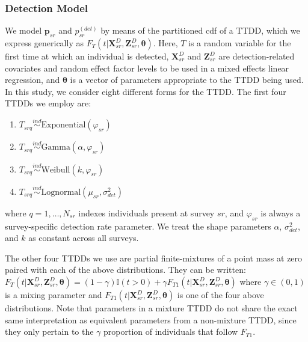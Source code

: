 \documentclass[useAMS,usenatbib,referee,12pt]{article}
\begin{document}
\subsubsection{Detection Model}\label{sec:detectionmodel}
We model $\textbf{p}_{sr}$ and $p_{sr}^{(det)}$ by means of the partitioned cdf of a TTDD, which we express generically as $F_T(t|\textbf{X}_{sr}^D, \textbf{Z}_{sr}^D, \boldsymbol{\theta})$.  Here, $T$ is a random variable for the first time at which an individual is detected, $\textbf{X}_{sr}^D$ and $\textbf{Z}_{sr}^D$ are detection-related covariates and random effect factor levels to be used in a mixed effects linear regression, and $\boldsymbol{\theta}$ is a vector of parameters appropriate to the TTDD being used.  In this study, we consider eight different forms for the TTDD.  The first four TTDDs we employ are:
\begin{enumerate}
\item $T_{srq} \overset{ind}{\sim} \text{Exponential}(\varphi_{sr})$
\item $T_{srq} \overset{ind}{\sim} \text{Gamma}(\alpha, \varphi_{sr})$
\item $T_{srq} \overset{ind}{\sim} \text{Weibull}(k, \varphi_{sr})$
\item $T_{srq} \overset{ind}{\sim} \text{Lognormal}(\mu_{sr}, \sigma_{det}^2)$
\end{enumerate}
where $q = 1,\dotso,N_{sr}$ indexes individuals present at survey $sr$, and $\varphi_{sr}$ is always a survey-specific detection rate parameter.  We treat the shape parameters $\alpha$, $\sigma_{det}^2$, and $k$ as constant across all surveys.

The other four TTDDs we use are partial finite-mixtures of a point mass at zero paired with each of the above distributions.  They can be written: $F_T(t|\textbf{X}_{sr}^D, \textbf{Z}_{sr}^D, \boldsymbol{\theta}) = (1-\gamma)\mathbb{I}(t>0) + \gamma F_{T1}(t|\textbf{X}_{sr}^D, \textbf{Z}_{sr}^D, \boldsymbol{\theta})$ where $\gamma \in (0,1)$ is a mixing parameter and $F_{T1}(t|\textbf{X}_{sr}^D, \textbf{Z}_{sr}^D, \boldsymbol{\theta})$ is one of the four above distributions.  Note that parameters in a mixture TTDD do not share the exact same interpretation as equivalent parameters from a non-mixture TTDD, since they only pertain to the $\gamma$ proportion of individuals that follow $F_{T1}$.
\end{document}
